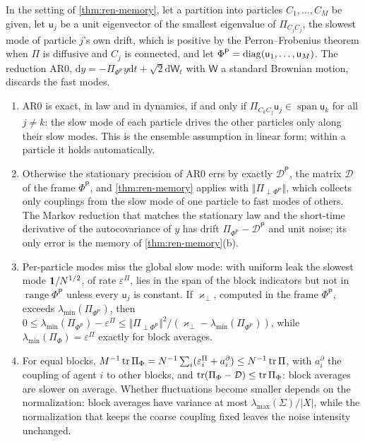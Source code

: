 \begin{proposition}\label{prop:ren-perron}
In the setting of \cref{thm:ren-memory}, let a partition into particles $C_1,\dots,C_M$ be given, let $\mathsf u_j$ be a unit eigenvector of the smallest eigenvalue of $\Pi_{C_jC_j}$, the slowest mode of particle $j$'s own drift, which is positive by the Perron--Frobenius theorem when $\Pi$ is diffusive and $C_j$ is connected, and let $\Phi^{\mathsf P}=\operatorname{diag}(\mathsf u_1,\dots,\mathsf u_M)$. The reduction AR0, $\mathrm dy=-\Pi_{\Phi^{\mathsf P}}y\mathrm dt+\sqrt2\mathrm d\mathsf W_t$ with $\mathsf W$ a standard Brownian motion, discards the fast modes.
\begin{enumerate}
\item[(a)] AR0 is exact, in law and in dynamics, if and only if $\Pi_{C_kC_j}\mathsf u_j\in\operatorname{span}\mathsf u_k$ for all $j\neq k$: the slow mode of each particle drives the other particles only along their slow modes. This is the ensemble assumption in linear form; within a particle it holds automatically.
\item[(b)] Otherwise the stationary precision of AR0 errs by exactly $\mathcal D^{\mathsf P}$, the matrix $\mathcal D$ of the frame $\Phi^{\mathsf P}$, and \cref{thm:ren-memory} applies with $\Vert\Pi_{\perp\Phi^{\mathsf P}}\Vert$, which collects only couplings from the slow mode of one particle to fast modes of others. The Markov reduction that matches the stationary law and the short-time derivative of the autocovariance of $y$ has drift $\Pi_{\Phi^{\mathsf P}}-\mathcal D^{\mathsf P}$ and unit noise; its only error is the memory of \cref{thm:ren-memory}(b).
\item[(c)] Per-particle modes miss the global slow mode: with uniform leak the slowest mode $\mathbf{1}/N^{1/2}$, of rate $\varepsilon^\Pi$, lies in the span of the block indicators but not in $\operatorname{range}\Phi^{\mathsf P}$ unless every $\mathsf u_j$ is constant. If $\varkappa_\perp$, computed in the frame $\Phi^{\mathsf P}$, exceeds $\lambda_{\min}(\Pi_{\Phi^{\mathsf P}})$, then $0\le\lambda_{\min}(\Pi_{\Phi^{\mathsf P}})-\varepsilon^\Pi\le\Vert\Pi_{\perp\Phi^{\mathsf P}}\Vert^2/(\varkappa_\perp-\lambda_{\min}(\Pi_{\Phi^{\mathsf P}}))$, while $\lambda_{\min}(\Pi_\Phi)=\varepsilon^\Pi$ exactly for block averages.
\item[(d)] For equal blocks, $M^{-1}\operatorname{tr}\Pi_\Phi=N^{-1}\sum_i(\varepsilon^\Pi_i+a^\partial_i)\le N^{-1}\operatorname{tr}\Pi$, with $a^\partial_i$ the coupling of agent $i$ to other blocks, and $\operatorname{tr}(\Pi_\Phi-\mathcal D)\le\operatorname{tr}\Pi_\Phi$: block averages are slower on average. Whether fluctuations become smaller depends on the normalization: block averages have variance at most $\lambda_{\max}(\Sigma)/\lvert X\rvert$, while the normalization that keeps the coarse coupling fixed leaves the noise intensity unchanged.
\end{enumerate}
\end{proposition}
